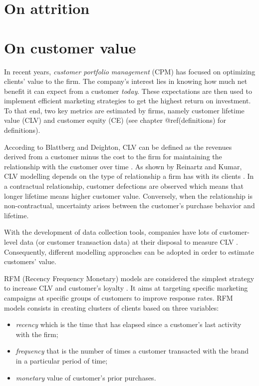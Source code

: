 \documentclass[
]{book}
\providecommand{\tightlist}{%
  \setlength{\itemsep}{0pt}\setlength{\parskip}{0pt}}
\begin{document}
\hypertarget{attrition}{%
\section{On attrition}\label{attrition}}

\hypertarget{value}{%
\section{On customer value}\label{value}}

In recent years, \emph{customer portfolio management} (CPM) has focused on optimizing clients' value to the firm. The company's interest lies in knowing how much net benefit it can expect from a customer \emph{today}. These expectations are then used to implement efficient marketing strategies to get the highest return on investment. To that end, two key metrics are estimated by firms, namely customer lifetime value (CLV) and customer equity (CE) (see chapter @ref(definitions) for definitions).

According to Blattberg and Deighton, CLV can be defined as the revenues derived from a customer minus the cost to the firm for maintaining the relationship with the customer over time \citep{CLV_DEF}. As shown by Reinartz and Kumar, CLV modelling depends on the type of relationship a firm has with its clients \citep{CLV_CONTEXT}. In a contractual relationship, customer defections are observed which means that longer lifetime means higher customer value. Conversely, when the relationship is non-contractual, uncertainty arises between the customer's purchase behavior and lifetime.

With the development of data collection tools, companies have lots of customer-level data (or customer transaction data) at their disposal to measure CLV \citep{CLV_NBD}. Consequently, different modelling approaches can be adopted in order to estimate customers' value.

RFM (Recency Frequency Monetary) models are considered the simplest strategy to increase CLV and customer's loyalty \citep{CLV}. It aims at targeting specific marketing campaigns at specific groups of customers to improve response rates. RFM models consists in creating clusters of clients based on three variables:

\begin{itemize}
\tightlist
\item
  \emph{recency} which is the time that has elapsed since a customer's last activity with the firm;
\item
  \emph{frequency} that is the number of times a customer transacted with the brand in a particular period of time;
\item
  \emph{monetary} value of customer's prior purchases.
\end{itemize}
\end{document}
